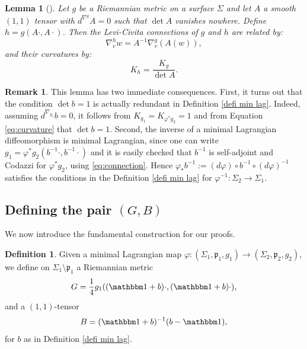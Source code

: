 \documentclass[JEP,XML,SOM,Unicode,NoEqCountersInSection,published]{cedram}
\newtheorem{lemma}[cor]{Lemma}
\theoremstyle{definition}
\newtheorem{defi}[cor]{Definition}
\newtheorem{remark}[cor]{Remark}
\begin{document}
\begin{lemma}[{\cite[Prop.\,3.12]{zbMATH05200423}}] \label{lemma KS}
Let $g$ be a Riemannian metric on a surface $\Sigma$ and let $A$ a smooth $(1,1)$ tensor with $d^{\nabla^g}\!\!A=0$ such that $\det A$ vanishes nowhere. Define $h=g(A\cdot,A\cdot)$. Then the Levi-Civita connections of $g$ and $h$ are related by:
\begin{equation}\label{eq:connection}
\nabla^h_v w=A^{-1}\nabla^g_v(A(w)),
\end{equation}
and their curvatures by:
\begin{equation}\label{eq:curvature}
K_h=\frac{K_g}{\det A}.
\end{equation}
\end{lemma}

\begin{remark} \label{rmk:detb}
This lemma has two immediate consequences. First, it turns out that the condition $\det b=1$ is actually redundant in Definition \ref{defi min lag}. Indeed, assuming $d^{\nabla_{g_1}}b=0$, it follows from $K_{g_1}=K_{\varphi^*g_2}=1$ and from Equation \eqref{eq:curvature} that
$\det b=1$. Second, the inverse of a minimal Lagrangian diffeomorphism is minimal Lagrangian, since one can write $g_1=\varphi^*g_2(b^{-1}\cdot,b^{-1}\cdot)$ and it is easily checked that $b^{-1}$ is self-adjoint and Codazzi for $\varphi^*g_2$, using \eqref{eq:connection}. Hence $\varphi_*b^{-1}:=(d\varphi)\circ b^{-1}\circ (d\varphi)^{-1}$ satisfies the conditions in the Definition \ref{defi min lag} for $\varphi^{-1}:\Sigma_2\to\Sigma_1$.
\end{remark}

\subsection{Defining the pair $(G,B)$}
We now introduce the fundamental construction for our proofs.

\begin{defi} \label{defi GB}
Given a minimal Lagrangian map $\varphi:(\Sigma_1,\mathfrak p_1,g_1)\to (\Sigma_2,\mathfrak p_2,g_2)$, we define on $\Sigma_1\setminus\mathfrak p_1$ a Riemannian metric
\[
G=\frac{1}{4}g_1((\mathbbm 1+b)\cdot,(\mathbbm 1+b)\cdot),
\]
and a $(1,1)$-tensor
\[
B=(\mathbbm 1+b)^{-1}(b-\mathbbm 1),
\]
for $b$ as in Definition \ref{defi min lag}.
\end{defi}
\end{document}
